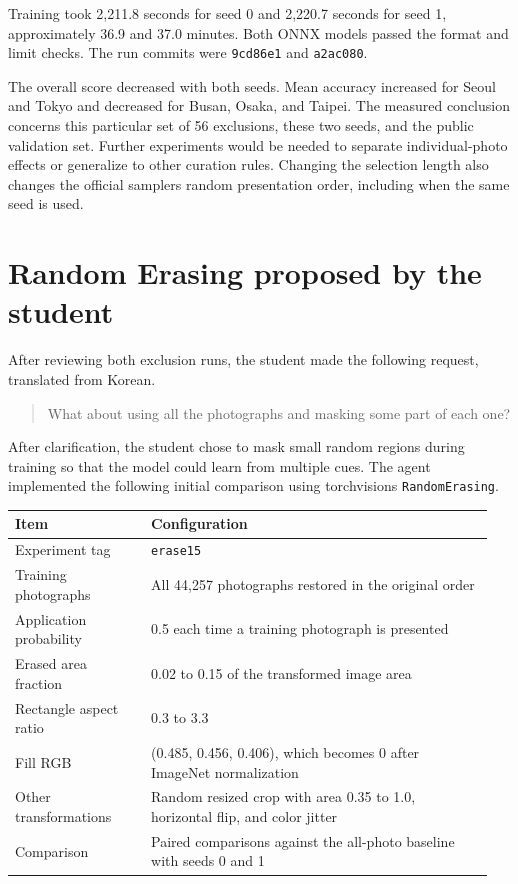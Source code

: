 \documentclass[11pt]{article}
\begin{document}
Training took 2,211.8 seconds for seed 0 and 2,220.7 seconds for seed 1,
approximately 36.9 and 37.0 minutes. Both ONNX models passed the format and
limit checks. The run commits were \texttt{9cd86e1} and \texttt{a2ac080}.

The overall score decreased with both seeds. Mean accuracy increased for
Seoul and Tokyo and decreased for Busan, Osaka, and Taipei. The measured
conclusion concerns this particular set of 56 exclusions, these two seeds,
and the public validation set. Further experiments would be needed to
separate individual-photo effects or generalize to other curation rules.
Changing the selection length also changes the official sampler\textquotesingle{}s random
presentation order, including when the same seed is used.

\section{Random Erasing proposed by the student}

After reviewing both exclusion runs, the student made the following request,
translated from Korean.

\begin{quote}\small
What about using all the photographs and masking some part of each one?
\end{quote}

After clarification, the student chose to mask small random regions during
training so that the model could learn from multiple cues. The agent
implemented the following initial comparison using torchvision\textquotesingle{}s
\texttt{RandomErasing}.

\begin{center}\small
\begin{tabular}{@{}p{0.27\linewidth}p{0.68\linewidth}@{}}
\toprule
Item & Configuration \\
\midrule
Experiment tag & \texttt{erase15} \\
Training photographs & All 44,257 photographs restored in the original order \\
Application probability & 0.5 each time a training photograph is presented \\
Erased area fraction & 0.02 to 0.15 of the transformed image area \\
Rectangle aspect ratio & 0.3 to 3.3 \\
Fill RGB & (0.485, 0.456, 0.406), which becomes 0 after ImageNet normalization \\
Other transformations & Random resized crop with area 0.35 to 1.0, horizontal flip, and color jitter \\
Comparison & Paired comparisons against the all-photo baseline with seeds 0 and 1 \\
\bottomrule
\end{tabular}
\end{center}
\end{document}
